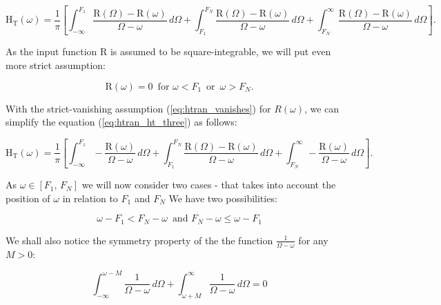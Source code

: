 \documentclass[12pt,twoside,a4paper]{article}
\numberwithin{equation}{subsection}
\numberwithin{figure}{subsection}
\begin{document}
\begin{equation} \label{eq:htran_ht_three}
  \mathrm{H_T}(\omega ) = \frac{1}{\pi } \left[ 
    \int_{ -\infty }^{F_1} \frac {\mathrm{R}(\Omega ) - \mathrm{R}(\omega )}{\Omega  - \omega }\,d\Omega 
  + \int_{ F_1 }^{ F_N }   \frac {\mathrm{R}(\Omega ) - \mathrm{R}(\omega )}{\Omega  - \omega }\,d\Omega 
  + \int_{ F_N }^{ \infty} \frac {\mathrm{R}(\Omega ) - \mathrm{R}(\omega )}{\Omega  - \omega }\,d\Omega 
  \right] .
\end{equation}

As the input function R is assumed to be square-integrable, we will put even more strict assumption:

\begin{equation} \label{eq:htran_vanishes}
  \mathrm{R}(\omega) = 0 \, \text{ for } \omega < F_1 \, \text { or } \, \omega > F_N.  
\end{equation}

With the strict-vanishing assumption (\ref{eq:htran_vanishes}) for $R(\omega)$, we can simplify the equation (\ref{eq:htran_ht_three}) as follows:

\begin{equation} \label{eq:htran_ht}
  \mathrm{H_T}(\omega ) = \frac{1}{\pi } \left[ 
    \int_{ -\infty }^{F_1} - \frac {\mathrm{R}(\omega )}{\Omega - \omega }\,d\Omega
  + \int_{ F_1 }^{ F_N }     \frac {\mathrm{R}(\Omega ) - \mathrm{R}(\omega )}{\Omega - \omega }\,d\Omega 
  + \int_{ F_N }^{ \infty} - \frac {\mathrm{R}(\omega )}{\Omega - \omega }\,d\Omega 
  \right] .
\end{equation}

As $\omega  \in [F_1, \,F_N]$  we will now consider two cases - that takes into account the position of  $\omega $ in relation to $F_1$  and $F_N$ We have two possibilities:

\begin{equation}   \label{eq:htran_twoposibilities}
	\omega - F_1 < F_N - \omega \, \text{ and } F_N - \omega \leq \omega - F_1 
\end{equation}

We shall also notice the symmetry property of the the function $\frac {1}{\Omega - \omega }$ for any $M > 0$:

\begin{equation} \label{eq:htran_forallm}
    \int_{ -\infty}^{\omega - M}\frac {1}{\Omega - \omega}\,d\Omega 
  + \int_{\omega + M}^{ \infty }\frac {1}{\Omega - \omega}\,d\Omega = 0
\end{equation}
\end{document}
